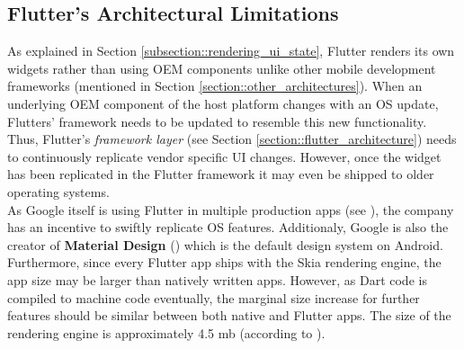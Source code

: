 \subsection{Flutter's Architectural Limitations}
As explained in Section \ref{subsection::rendering_ui_state}, Flutter renders its own widgets rather than using OEM components unlike other mobile development frameworks (mentioned in Section \ref{section::other_architectures}). 
When an underlying OEM component of the host platform changes with an OS update, Flutters' framework needs to be updated to resemble this new 
functionality. 
Thus, Flutter's \textit{framework layer} (see Section \ref{section::flutter_architecture}) needs to continuously replicate vendor specific UI changes.
However, once the widget has been replicated in the Flutter framework it may even be shipped to older operating systems.\\
As Google itself is using Flutter in multiple production apps (see \cite{FlutterShowcase2021}), the company has an incentive to swiftly replicate OS features.
Additionaly, Google is also the creator of \textbf{Material Design} (\cite{Google2021}) which is the default design system on Android.\\
Furthermore, since every Flutter app ships with the Skia rendering engine, the app size may be larger than natively written apps.
However, as Dart code is compiled to machine code eventually, the marginal size increase for further features should be similar between both native 
and Flutter apps.
The size of the rendering engine is approximately 4.5 mb (according to \cite{FlutterFAQ2021}).
